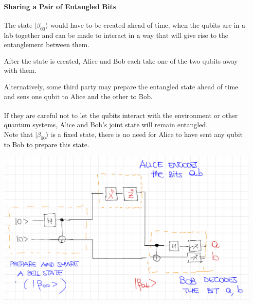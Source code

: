 \documentclass[10pt]{report}
\begin{document}
\paragraph{Sharing a Pair of Entangled Bits}\begin{list}{}{}
	\item The state $|\beta_{00}\rangle$ would have to be created ahead of time, when the qubits are in a lab together and can be made to interact in a way that will give rise to the entanglement between them.
	\item After the state is created, Alice and Bob each take one of the two qubits away with them.
\end{list}
Alternatively, some third party may prepare the entangled state ahead of time and sens one qubit to Alice and the other to Bob.\\\\
If they are careful not to let the qubits interact with the environment or other quantum systems, Alice and Bob's joint state will remain entangled.\\
Note that $|\beta_{00}\rangle$ is a fixed state, there is no need for Alice to have sent any qubit to Bob to prepare this state.
\begin{center}
	\includegraphics[scale=0.5]{16.png}
\end{center}
\end{document}
